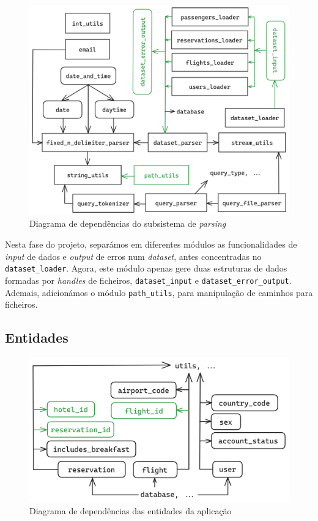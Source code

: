 \documentclass[12pt, a4paper]{article}
\begin{document}
\begin{figure}[ht]
    \centering
    \includegraphics[scale=0.17]{res-fase2/parsing.png}
    \caption{Diagrama de dependências do subsistema de \emph{parsing}}
    \label{fig:parsing}
\end{figure}

Nesta fase do projeto, separámos em diferentes módulos as funcionalidades de \emph{input} de dados
e \emph{output} de erros num \emph{dataset}, antes concentradas no \texttt{dataset\_loader}. Agora,
este módulo apenas gere duas estruturas de dados formadas por \emph{handles} de ficheiros,
\texttt{dataset\_input} e \texttt{dataset\_error\_output}. Ademais, adicionámos o módulo
\texttt{path\_utils}, para manipulação de caminhos para ficheiros.

\subsection{Entidades}
\label{sec:entities}

\begin{figure}[ht]
    \centering
    \includegraphics[scale=0.2]{res-fase2/entities.png}
    \caption{Diagrama de dependências das entidades da aplicação}
    \label{fig:entities}
\end{figure}
\end{document}
